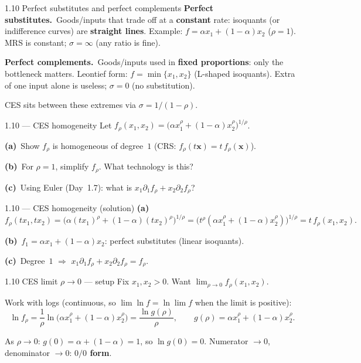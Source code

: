 \documentclass[11pt,aspectratio=169]{beamer}
\newcommand{\QFrame}[1]{%
  \begin{frame}{#1 \quad {\small\textcolor{mAccent}{Together}}}}
\begin{document}
\begin{frame}{1.10 Perfect substitutes and perfect complements}
  \footnotesize
  \textbf{Perfect substitutes.}\ Goods/inputs that trade off at a
  \textbf{constant} rate: isoquants (or indifference curves) are
  \textbf{straight lines}.
  Example: $f=\alpha x_1+(1-\alpha)x_2$ ($\rho=1$).
  MRS is constant; $\sigma=\infty$ (any ratio is fine).

  \medskip
  \textbf{Perfect complements.}\ Goods/inputs used in
  \textbf{fixed proportions}: only the bottleneck matters.
  Leontief form: $f=\min\{x_1,x_2\}$
  (L-shaped isoquants). Extra of one input alone is useless;
  $\sigma=0$ (no substitution).

  \medskip
  {\scriptsize CES sits between these extremes via $\sigma=1/(1-\rho)$.}
\end{frame}

\QFrame{1.10 --- CES homogeneity}
  \scriptsize
  Let
  $f_{\rho}(x_1,x_2)=\bigl(\alpha x_1^{\rho}+(1-\alpha)x_2^{\rho}\bigr)^{1/\rho}$.

  \medskip
  \textbf{(a)}\ Show $f_{\rho}$ is homogeneous of degree~$1$
  (CRS: $f_{\rho}(t\mathbf{x})=t\,f_{\rho}(\mathbf{x})$).

  \medskip
  \textbf{(b)}\ For $\rho=1$, simplify $f_{\rho}$. What technology is this?

  \medskip
  \textbf{(c)}\ Using Euler (Day~1.7): what is $x_1\partial_1 f_{\rho}+x_2\partial_2 f_{\rho}$?
\end{frame}

\QFrame{1.10 --- CES homogeneity (solution)}
  \scriptsize
  \textbf{(a)}\
  \[
    f_{\rho}(tx_1,tx_2)
    =\bigl(\alpha (tx_1)^{\rho}+(1-\alpha)(tx_2)^{\rho}\bigr)^{1/\rho}
    =\bigl(t^{\rho}(\alpha x_1^{\rho}+(1-\alpha)x_2^{\rho})\bigr)^{1/\rho}
    =t\,f_{\rho}(x_1,x_2).
  \]

  \medskip
  \textbf{(b)}\ $f_1=\alpha x_1+(1-\alpha)x_2$: perfect substitutes (linear isoquants).

  \medskip
  \textbf{(c)}\ Degree~$1$ $\Rightarrow$ $x_1\partial_1 f_{\rho}+x_2\partial_2 f_{\rho}=f_{\rho}$.
\end{frame}

\begin{frame}{1.10 CES limit $\rho\to 0$ --- setup}
  \footnotesize
  Fix $x_1,x_2>0$. Want
  $\displaystyle\lim_{\rho\to 0}f_{\rho}(x_1,x_2)$.

  \medskip
  Work with logs (continuous, so $\lim\ln f=\ln\lim f$ when the limit is positive):
  \[
    \ln f_{\rho}
    =\frac{1}{\rho}\ln\bigl(\alpha x_1^{\rho}+(1-\alpha)x_2^{\rho}\bigr)
    =\frac{\ln g(\rho)}{\rho},
    \qquad
    g(\rho)=\alpha x_1^{\rho}+(1-\alpha)x_2^{\rho}.
  \]

  \medskip
  As $\rho\to 0$: $g(0)=\alpha+(1-\alpha)=1$, so $\ln g(0)=0$.
  Numerator $\to 0$, denominator $\to 0$: \textbf{$0/0$ form}.
\end{frame}
\end{document}
